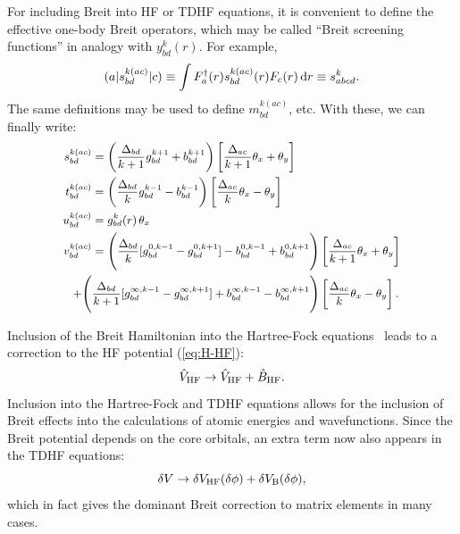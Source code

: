 \documentclass[10pt,twocolumn,a4paper]{article}%
\newcommand{\be}{\begin{equation}}
\newcommand{\ee}{\end{equation}}
\def\d{\ensuremath{{\rm d}}}
\begin{document}
For including Breit into HF or TDHF equations, it is convenient to define the effective one-body Breit operators, which may be called ``Breit screening functions'' in analogy with $y^k_{bd}(r)$.
For example,
\[
({a}|s^{k(ac)}_{bd}|{c}) \equiv
\int F_a^\dag(r) s^{k(ac)}_{bd}(r) {F_c}(r)\,\d r \equiv
s^k_{abcd}.
\]
The same definitions may be used to define $m^{k(ac)}_{bd}$, etc.
%
With these, we can finally write:
\begin{equation}\small
\begin{split}
s^{k(ac)}_{bd} &= 
\left(\frac{\Delta_{bd}}{k+1}g^{k+1}_{bd}+b^{k+1}_{bd}\right)
\left[\frac{\Delta_{ac}}{k+1}\theta_x + \theta_y\right]\\
%
t^{k(ac)}_{bd} &= 
\left(\frac{\Delta_{bd}}{k}g^{k-1}_{bd}-b^{k-1}_{bd}\right)
\left[\frac{\Delta_{ac}}{k}\theta_x - \theta_y\right]\\
%
u^{k(ac)}_{bd} &= 
g^k_{bd}(r)
\,\theta_x \\
%
v^{k(ac)}_{bd} &= \Bigg(
\frac{\Delta_{bd}}{k}[g^{0,k-1}_{bd}-g^{0,k+1}_{bd}]
-b^{0,k-1}_{bd}+b^{0,k+1}_{bd}
\Bigg)\left[\frac{\Delta_{ac}}{k+1}\theta_x + \theta_y\right]\\
+\Bigg(&
\frac{\Delta_{bd}}{k+1}[g^{\infty,k-1}_{bd}-g^{\infty,k+1}_{bd}]
+b^{\infty,k-1}_{bd}-b^{\infty,k+1}_{bd}
\Bigg)\left[\frac{\Delta_{ac}}{k}\theta_x - \theta_y\right].
\end{split}
\end{equation}






Inclusion of the Breit Hamiltonian into the Hartree-Fock equations~\cite{Derevianko2001} leads to a correction to the HF potential (\ref{eq:H-HF}):
\be
\hat V_{\rm HF} \to  \hat V_{\rm HF}  + \hat B_{\rm HF} .
\ee
Inclusion into the Hartree-Fock and TDHF equations allows for the inclusion of Breit effects into the calculations of atomic energies and wavefunctions.
Since the Breit potential depends on the core orbitals, an extra term now also appears in the TDHF equations: 
\be
\delta V\to \delta V_{\rm HF}(\delta\phi)+\delta V_{\rm B}(\delta\phi),
\ee
which in fact gives the dominant Breit correction to matrix elements in many cases.
\end{document}
